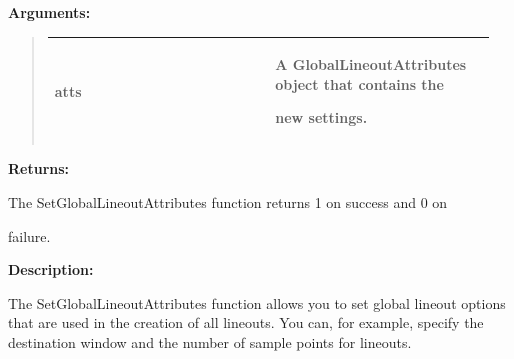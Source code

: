 \documentclass[letterpaper,10pt,english]{sphinxmanual}
\begin{document}
\begin{DUlineblock}{0em}
\item[] 
\item[] \textbf{Arguments:}
\end{DUlineblock}
\begin{quote}

\begin{tabular}{|p{0.475\linewidth}|p{0.475\linewidth}|}
\hline

atts
 & 
\begin{DUlineblock}{0em}
\item[] A GlobalLineoutAttributes object that contains the
\item[] new settings.
\end{DUlineblock}
\\
\hline\end{tabular}

\end{quote}

\begin{DUlineblock}{0em}
\item[] 
\item[] \textbf{Returns:}
\item[] The SetGlobalLineoutAttributes function returns 1 on success and 0 on
\item[] failure.
\item[] 
\item[] \textbf{Description:}
\item[] The SetGlobalLineoutAttributes function allows you to set global lineout
options that are used in the creation of all lineouts. You can, for
example, specify the destination window and the number of sample points for
lineouts.
\end{DUlineblock}

\begin{DUlineblock}{0em}
\item[] 
\end{DUlineblock}
\end{document}
